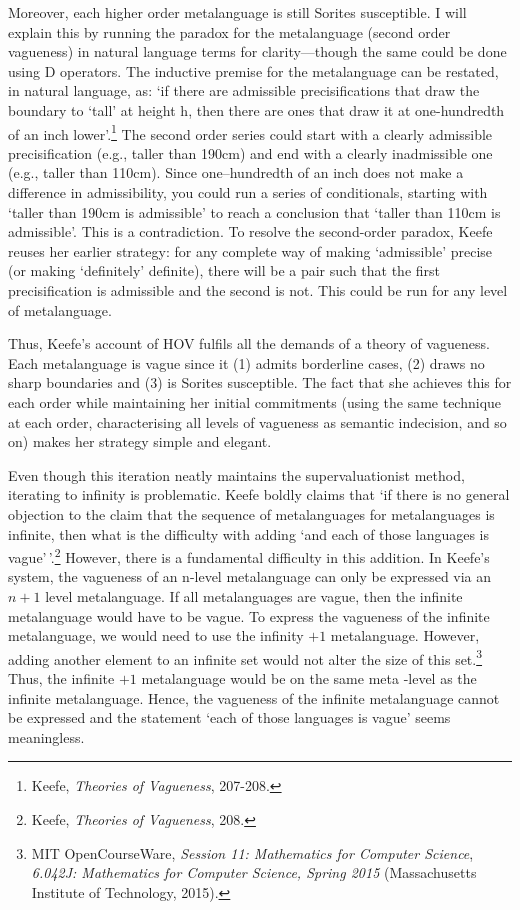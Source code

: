 Moreover, each higher order metalanguage is still Sorites susceptible. I
will explain this by running the paradox for the metalanguage (second
order vagueness) in natural language terms for clarity---though the same
could be done using D operators. The inductive premise for the
metalanguage can be restated, in natural language, as: `if there are
admissible precisifications that draw the boundary to `tall' at height
h, then there are ones that draw it at one-hundredth of an inch
lower'.\footnote{Keefe, \emph{Theories of Vagueness}, 207-208.} The
second order series could start with a clearly admissible
precisification (e.g., taller than 190cm) and end with a clearly
inadmissible one (e.g., taller than 110cm). Since one--hundredth of an
inch does not make a difference in admissibility, you could run a series
of conditionals, starting with `taller than 190cm is admissible' to
reach a conclusion that `taller than 110cm is admissible'. This is a
contradiction. To resolve the second-order paradox, Keefe reuses her
earlier strategy: for any complete way of making `admissible' precise
(or making `definitely' definite), there will be a pair such that the
first precisification is admissible and the second is not. This could be
run for any level of metalanguage.

Thus, Keefe's account of HOV fulfils all the demands of a theory of
vagueness. Each metalanguage is vague since it (1) admits borderline
cases, (2) draws no sharp boundaries and (3) is Sorites susceptible. The
fact that she achieves this for each order while maintaining her initial
commitments (using the same technique at each order, characterising all
levels of vagueness as semantic indecision, and so on) makes her
strategy simple and elegant.

Even though this iteration neatly maintains the supervaluationist
method, iterating to infinity is problematic. Keefe boldly claims that
`if there is no general objection to the claim that the sequence of
metalanguages for metalanguages is infinite, then what is the difficulty
with adding `and each of those languages is vague'\,'.\footnote{Keefe,
  \emph{Theories of Vagueness}, 208.} However, there is a fundamental
difficulty in this addition. In Keefe's system, the vagueness of an
n-level metalanguage can only be expressed via an $n+1$ level
metalanguage. If all metalanguages are vague, then the infinite
metalanguage would have to be vague. To express the vagueness of the
infinite metalanguage, we would need to use the infinity $+ 1$
metalanguage. However, adding another element to an infinite set would
not alter the size of this set.\footnote{MIT OpenCourseWare,
  \emph{Session 11: Mathematics for Computer Science}, \emph{6.042J:
  Mathematics for Computer Science, Spring 2015} (Massachusetts
  Institute of Technology, 2015).}
Thus, the infinite $+ 1$ metalanguage would be on the same meta -level as
the infinite metalanguage. Hence, the vagueness of the infinite
metalanguage cannot be expressed and the statement `each of those
languages is vague' seems meaningless.

